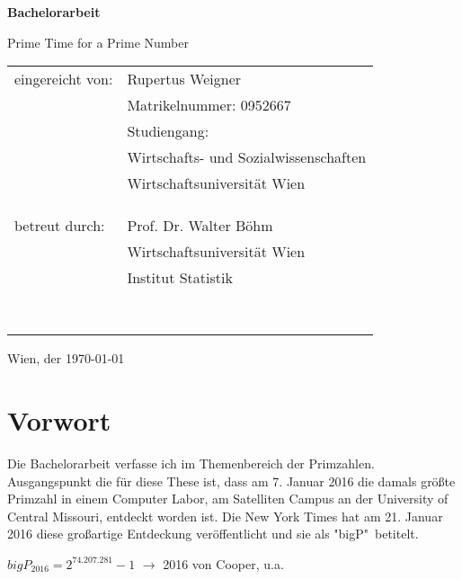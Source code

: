 \documentclass[12pt,a4paper]{article}
\theoremstyle{definition}
\begin{document}
\thispagestyle{empty}

\noindent \vspace{1cm}

\noindent \begin{center}
\textbf{\Large{}Bachelorarbeit}
\par\end{center}{\Large \par}

\noindent \begin{center}
{\large{}Prime Time for a Prime Number}
\par\end{center}{\large \par}

\noindent \begin{flushleft}
{\Large{}\vspace{3.5cm}
}
\par\end{flushleft}{\Large \par}

\begin{tabular}{ll}
eingereicht von:\hspace{1cm} & Rupertus Weigner\tabularnewline
 & Matrikelnummer: 0952667\tabularnewline
 & Studiengang:\tabularnewline
 & Wirtschafts- und Sozialwissenschaften\tabularnewline
 & Wirtschaftsuniversität Wien\tabularnewline
 & \tabularnewline
 & \tabularnewline
 & \tabularnewline
betreut durch: & Prof. Dr. Walter Böhm\tabularnewline
 & Wirtschaftsuniversität Wien\tabularnewline
 & Institut Statistik\tabularnewline
 & \tabularnewline
 & \tabularnewline
 & \tabularnewline
 & \tabularnewline
 & \tabularnewline
 & \tabularnewline
 & \tabularnewline
 & \tabularnewline
\end{tabular}

\begin{flushright}
{Wien, der \today}
\end{flushright}

\newpage

\section*{Vorwort}
Die Bachelorarbeit verfasse ich im Themenbereich der Primzahlen.
Ausgangspunkt die für diese These ist, dass am 7. Januar 2016 die damals größte Primzahl in einem Computer Labor, am Satelliten Campus an der University of Central Missouri, entdeckt worden ist.
Die New York Times hat am 21. Januar 2016 diese großartige Entdeckung veröffentlicht und sie als "bigP"\ betitelt.
\begin{center}
$bigP_{2016} = 2^{74.207.281}-1$ $\rightarrow$ 2016 von Cooper, u.a.
\end{center}
\end{document}
